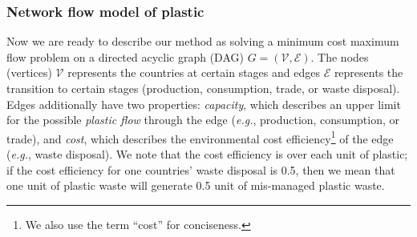 \subsubsection{Network flow model of plastic}

Now we are ready to describe our method as solving a minimum cost maximum flow problem on a directed acyclic graph (DAG) $G = (\mathcal{V}, \mathcal{E})$. The nodes (vertices) $\mathcal{V}$ represents the countries at certain stages and edges $\mathcal{E}$ represents the transition to certain stages (production, consumption, trade, or waste disposal). Edges additionally have two properties: \textit{capacity}, which describes an upper limit for the possible \textit{plastic flow} through the edge (\textit{e.g.}, production, consumption, or trade), and \textit{cost}, which describes the environmental cost efficiency\footnote{We also use the term ``cost'' for conciseness.} of the edge (\textit{e.g.}, waste disposal). We note that the cost efficiency is over each unit of plastic; if the cost efficiency for one countries' waste disposal is 0.5, then we mean that one unit of plastic waste will generate 0.5 unit of mis-managed plastic waste.

